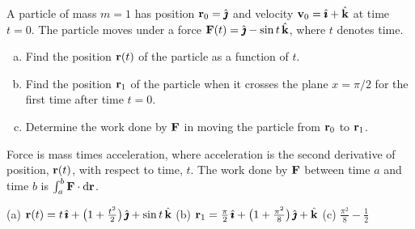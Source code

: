 \begin{solution}

\end{solution}

\begin{question}[M317 2009A] %
A particle of mass $m = 1$ has position $\mathbf{r}_0 = \hat{\pmb{\jmath}}$ and velocity 
$\mathbf{v}_0 = \hat{\pmb{\imath}} + \hat{\mathbf{k}}$ at time $t = 0$. The particle moves under a force
$\mathbf{F}(t) = \hat{\pmb{\jmath}} - \sin t\, \hat{\mathbf{k}}$, where $t$ denotes time.

\begin{enumerate}[(a)]
\item
Find the position $\mathbf{r}(t)$ of the particle as a function of $t$.
\item
Find the position $\mathbf{r}_1$ of the particle when it crosses the plane 
$x = \pi/2$ for the first time after time $t = 0$.
\item
Determine the work done by $\mathbf{F}$ in moving the particle from $\mathbf{r}_0$ to 
$\mathbf{r}_1$.
\end{enumerate}
\end{question}

\begin{hint} 
Force is mass times acceleration, where acceleration is the second derivative of position, $\mathbf{r}(t)$, with respect to time, $t$. The work done by $\mathbf{F}$ between time $a$ and time $b$
is $\int_a^b \mathbf{F}\cdot\mathrm{d}\mathbf{r}$.
\end{hint}

\begin{answer} 
(a) $\mathbf{r}(t) = t\,\hat{\pmb{\imath}}+\big(1+\frac{t^2}{2}\big)\,\hat{\pmb{\jmath}} +\sin t\,\hat{\mathbf{k}}$\qquad
(b) $\mathbf{r}_1 = \frac{\pi}{2}\,\hat{\pmb{\imath}}+\big(1+\frac{\pi^2}{8}\big)\,\hat{\pmb{\jmath}} + \hat{\mathbf{k}}$
\qquad
(c) $\frac{\pi^2}{8}-\frac{1}{2}$
\end{answer}

